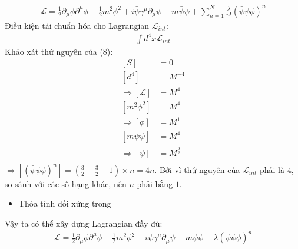 \documentclass{article}
\begin{document}
\begin{align}
	\mathcal{L}=\frac{1}{2}\partial_\mu\phi\partial^\mu\phi-\frac{1}{2}m^2\phi^2+i\bar{\psi}\gamma^\mu\partial_\mu\psi-m\bar{\psi}\psi+\sum_{n=1}^{N}\frac{\lambda}{n!}(\bar{\psi}\psi\phi)^n
\end{align}
Điều kiện tái chuẩn hóa cho Lagrangian $\mathcal{L}_{int}$:
\begin{align}
	\int d^4 x \mathcal{L}_{int}
\end{align}
Khảo xát thứ nguyên của (8):
\begin{equation}
	\begin{split}
		[S]&=0\\
		[d^4]&=M^{-4}\\
		\Rightarrow	[\mathcal{L}]&=M^4\\
		\left[m^2\phi^2\right]&=M^4\\
		\Rightarrow[\phi]&=M^1\\
		\left[m\bar{\psi}\psi\right]&=M^4\\
		\Rightarrow[\psi]&=M^{\frac{3}{2}}\\
	\end{split}
\end{equation}
$\Rightarrow\left[(\bar{\psi}\psi\phi)^n\right]=(\frac{3}{2}+\frac{3}{2}+1)\times n=4n$. Bởi vì thứ nguyên của  $\mathcal{L}_{int}$ phải là 4, so sánh với các số hạng khác, nên $n$ phải bằng $1$.
\begin{itemize}
	\item Thỏa tính đối xứng trong
\end{itemize}
Vậy ta có thể xây dựng Lagrangian đầy đủ:
\begin{align}
	\mathcal{L}=\frac{1}{2}\partial_\mu\phi\partial^\mu\phi-\frac{1}{2}m^2\phi^2+i\bar{\psi}\gamma^\mu\partial_\mu\psi-m\bar{\psi}\psi + \lambda(\bar{\psi}\psi\phi)^n
\end{align}
\end{document}
